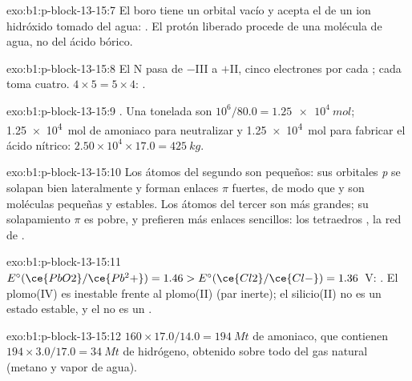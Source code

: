 \begin{solution}{exo:b1:p-block-13-15:7}
El boro tiene un orbital vacío y acepta el  de un ion
hidróxido tomado del agua: . El
protón liberado procede de una molécula de agua, no del ácido bórico.
\end{solution}

\begin{solution}{exo:b1:p-block-13-15:8}
El N pasa de $-$III a $+$II, cinco electrones por cada ; cada
 toma cuatro. $4 \times 5 = 5 \times 4$: .
\end{solution}

\begin{solution}{exo:b1:p-block-13-15:9}
. Una tonelada son $10^6/80.0 = \qty{1.25e4}{mol}$;
\qty{1.25e4}{mol} de amoniaco para neutralizar y \qty{1.25e4}{mol} para
fabricar el ácido nítrico: $2.50 \times 10^4 \times 17.0 = \qty{425}{kg}$.
\end{solution}

\begin{solution}{exo:b1:p-block-13-15:10}
Los átomos del segundo  son pequeños: sus orbitales \textit{p} se
solapan bien lateralmente y forman enlaces $\pi$ fuertes, de modo que
 y  son moléculas pequeñas y estables. Los átomos del
tercer  son más grandes; su solapamiento $\pi$ es pobre, y
prefieren más enlaces sencillos: los tetraedros , la red de
.
\end{solution}

\begin{solution}{exo:b1:p-block-13-15:11}
$E^\circ(\ce{PbO2}/\ce{Pb^2+}) = 1.46 > E^\circ(\ce{Cl2}/\ce{Cl-}) = 1.36$~V:
. El plomo(IV) es inestable
frente al plomo(II) (par inerte); el silicio(II) no es un estado estable,
y el  no es un .
\end{solution}

\begin{solution}{exo:b1:p-block-13-15:12}
$160 \times 17.0/14.0 = \qty{194}{Mt}$ de amoniaco, que contienen $194 \times
3.0/17.0 = \qty{34}{Mt}$ de hidrógeno, obtenido sobre todo del gas natural
(metano y vapor de agua).
\end{solution}

